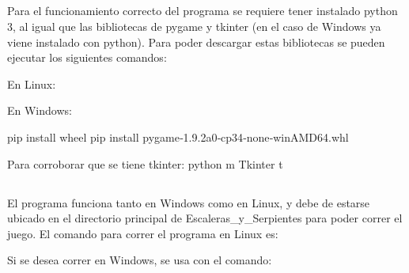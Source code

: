 \documentclass[letterpaper,10pt,english]{sphinxmanual}
\begin{document}
\subsection{}
\label{\detokenize{tutorial:requerimientos}}
Para el funcionamiento correcto del programa se requiere tener instalado python 3, al igual que las bibliotecas de pygame y tkinter (en el caso de Windows ya viene instalado con python). Para poder descargar estas bibliotecas se pueden ejecutar los siguientes comandos:

En Linux:

\begin{sphinxVerbatim}[commandchars=\\\{\}]
   
  
     

  
\end{sphinxVerbatim}

En Windows:

\begin{sphinxVerbatim}[commandchars=\\\{\}]
pip install wheel
pip install pygame‑1.9.2a0‑cp34‑none‑win\PYGZus{}AMD64.whl

Para corroborar que se tiene tkinter: python \PYGZhy{}m Tkinter t
\end{sphinxVerbatim}


\subsection{}
\label{\detokenize{tutorial:comandos-para-correr-el-programa}}
El programa funciona tanto en Windows como en Linux, y debe de estarse ubicado en el directorio principal de Escaleras\_y\_Serpientes para poder correr el juego. El comando para correr el programa en Linux es:

\begin{sphinxVerbatim}[commandchars=\\\{\}]
 
\end{sphinxVerbatim}

Si se desea correr en Windows, se usa con el comando:
\end{document}
